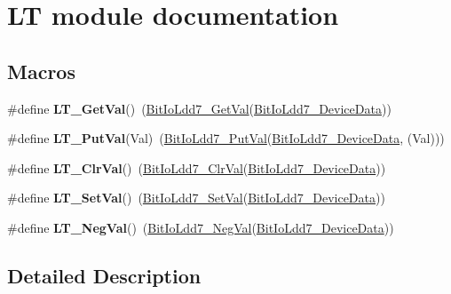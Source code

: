 \hypertarget{group___l_t__module}{\section{L\-T module documentation}
\label{group___l_t__module}
}
\subsection*{Macros}
\begin{DoxyCompactItemize}
\item 
\hypertarget{group___l_t__module_ga9ab19784f90ae5597ae3c9482364518e}{\#define {\bfseries L\-T\-\_\-\-Get\-Val}()~(\hyperlink{group___bit_io_ldd7__module_ga3ee3dd087f234ca3a6c498e95a6b8f9b}{Bit\-Io\-Ldd7\-\_\-\-Get\-Val}(\hyperlink{group___bit_io_ldd7__module_ga28a1c938c911f765d2dc333694f9505f}{Bit\-Io\-Ldd7\-\_\-\-Device\-Data}))}\label{group___l_t__module_ga9ab19784f90ae5597ae3c9482364518e}

\item 
\hypertarget{group___l_t__module_gae7d4945cb4bc34eadc0980426ce52195}{\#define {\bfseries L\-T\-\_\-\-Put\-Val}(Val)~(\hyperlink{group___bit_io_ldd7__module_ga5ed462070056354e28dd16e59c3cf772}{Bit\-Io\-Ldd7\-\_\-\-Put\-Val}(\hyperlink{group___bit_io_ldd7__module_ga28a1c938c911f765d2dc333694f9505f}{Bit\-Io\-Ldd7\-\_\-\-Device\-Data}, (Val)))}\label{group___l_t__module_gae7d4945cb4bc34eadc0980426ce52195}

\item 
\hypertarget{group___l_t__module_ga607ed9ac0caa3e0c6fd17f16435e5bad}{\#define {\bfseries L\-T\-\_\-\-Clr\-Val}()~(\hyperlink{group___bit_io_ldd7__module_ga6eafafb0a2c30b4347462e6ff00d6f45}{Bit\-Io\-Ldd7\-\_\-\-Clr\-Val}(\hyperlink{group___bit_io_ldd7__module_ga28a1c938c911f765d2dc333694f9505f}{Bit\-Io\-Ldd7\-\_\-\-Device\-Data}))}\label{group___l_t__module_ga607ed9ac0caa3e0c6fd17f16435e5bad}

\item 
\hypertarget{group___l_t__module_ga6ed836cf2c966f7895e624f1dc609171}{\#define {\bfseries L\-T\-\_\-\-Set\-Val}()~(\hyperlink{group___bit_io_ldd7__module_gaae11392cdaf0061ec255e1de58e509f5}{Bit\-Io\-Ldd7\-\_\-\-Set\-Val}(\hyperlink{group___bit_io_ldd7__module_ga28a1c938c911f765d2dc333694f9505f}{Bit\-Io\-Ldd7\-\_\-\-Device\-Data}))}\label{group___l_t__module_ga6ed836cf2c966f7895e624f1dc609171}

\item 
\hypertarget{group___l_t__module_gacde57e865f2662a28bebda30900daed3}{\#define {\bfseries L\-T\-\_\-\-Neg\-Val}()~(\hyperlink{group___bit_io_ldd7__module_gacf8b1f0a63a31fdfd3cd3bb2589414b1}{Bit\-Io\-Ldd7\-\_\-\-Neg\-Val}(\hyperlink{group___bit_io_ldd7__module_ga28a1c938c911f765d2dc333694f9505f}{Bit\-Io\-Ldd7\-\_\-\-Device\-Data}))}\label{group___l_t__module_gacde57e865f2662a28bebda30900daed3}

\end{DoxyCompactItemize}


\subsection{Detailed Description}
